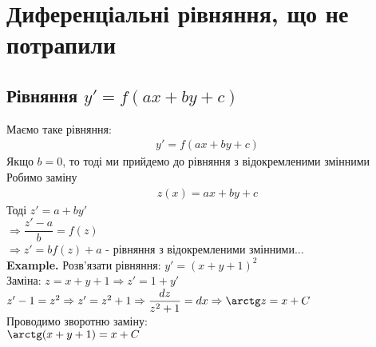 \documentclass[a4paper, 14pt]{extarticle}
\def\bigline{\vspace{5mm}\\}
\begin{document}
\newpage
\section{Диференціальні рівняння, що не потрапили}
\subsection{Рівняння $y' = f(ax+by+c)$}
Маємо таке рівняння:
\begin{align*}
y' = f(ax+by+c)
\end{align*}
Якщо $b = 0$, то тоді ми прийдемо до рівняння з відокремленими змінними\\
Робимо заміну
\begin{align*}
z(x) = ax + by + c
\end{align*}
Тоді $z' = a + by'$\\
$\Rightarrow \dfrac{z'-a}{b} = f(z)$\\
$\Rightarrow z' = bf(z) + a$ - рівняння з відокремленими змінними...
\bigline
\textbf{Example.} Розв'язати рівняння: $y' = (x+y+1)^2$\\
Заміна: $z = x+y+1 \Rightarrow z' = 1 + y'$\\
$z' - 1 = z^2 \Rightarrow z' = z^2 + 1 \Rightarrow \dfrac{dz}{z^2+1} = dx \Rightarrow \arctg z = x + C$\\
Проводимо зворотню заміну:\\
$\arctg(x+y+1) = x + C$
\bigline
\end{document}
